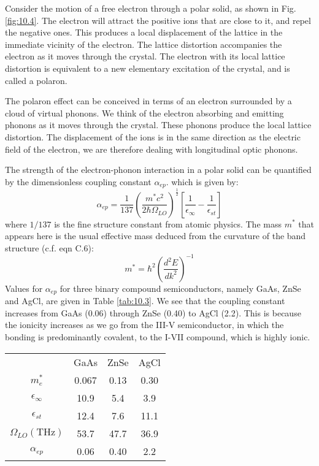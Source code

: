 \documentclass[12pt]{book}
\begin{document}
Consider the motion of a free electron through a polar solid, as shown in Fig. \ref{fig:10.4}. The electron will attract the positive ions that are close to it, and repel the negative ones. This produces a local displacement of the lattice in the immediate vicinity of the electron. The lattice distortion accompanies the electron as it moves through the crystal. The electron with its local lattice distortion is equivalent to a new elementary excitation of the crystal, and is called a polaron.

The polaron effect can be conceived in terms of an electron surrounded by a cloud of virtual phonons. We think of the electron absorbing and emitting phonons as it moves through the crystal. These phonons produce the local lattice distortion. The displacement of the ions is in the same direction as the electric field of the electron, we are therefore dealing with longitudinal optic phonons.

The strength of the electron-phonon interaction in a polar solid can be quantified by the dimensionless coupling constant $\alpha_{ep}$. which is given by:
\begin{equation}\label{equa:10.20}
  \alpha_{ep}=\frac{1}{137}\left(\frac{m^*c^2}{2\hbar\Omega_{LO}}\right)^{\frac{1}{2}}[\frac{1}{\epsilon_{\infty}}-\frac{1}{\epsilon_{st}}]
\end{equation}
where $1/137$ is the fine structure constant from atomic physics. The mass $m^*$ that appears here is the usual effective mass deduced from the curvature of the band structure (c.f. eqn C.6):
\begin{equation}\label{equa:10.21}
  m^*=\hbar^2\left(\frac{d^2E}{dk^2}\right)^{-1}
\end{equation}
Values for $\alpha_{ep}$ for three binary compound semiconductors, namely GaAs, ZnSe and AgCl, are given in Table \ref{tab:10.3}. We see that the coupling constant increases from GaAs (0.06) through ZnSe (0.40) to AgCl (2.2). This is because the ionicity increases as we go from the III-V semiconductor, in which the bonding is predominantly covalent, to the I-VII compound, which is highly ionic.

\begin{table}
  \centering
  \begin{tabular}{cccc}

     & GaAs & ZnSe & AgCl \\
    $m_e^*$ & 0.067 & 0.13 & 0.30 \\
    $\epsilon_{\infty}$ & 10.9 & 5.4 & 3.9 \\
    $\epsilon_{st}$ & 12.4 & 7.6 & 11.1 \\
    $\Omega_{LO}(\mathrm{THz})$ & 53.7 & 47.7 & 36.9 \\
    $\alpha_{ep}$ & 0.06 & 0.40 & 2.2 \\

  \end{tabular}
\end{table}
\end{document}
